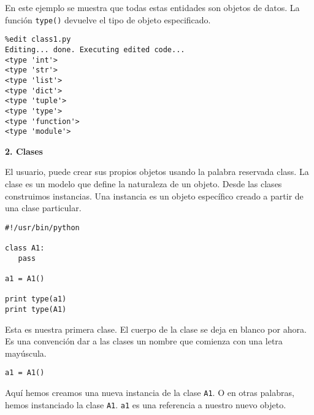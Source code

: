 \documentclass[twoside,10.5pt]{article}%
\begin{document}
\vspace{0.3cm}


En este ejemplo se muestra que todas estas entidades son objetos de datos. La funci\'on \texttt{type()} devuelve el tipo de objeto especificado.

\vspace{0.3cm}

\begin{verbatim}
%edit class1.py
Editing... done. Executing edited code...
<type 'int'>
<type 'str'>
<type 'list'>
<type 'dict'>
<type 'tuple'>
<type 'type'>
<type 'function'>
<type 'module'>
\end{verbatim}

\vspace{0.3cm}

\textbf{2. Clases}

El usuario, puede crear sus propios objetos usando la palabra reservada {\color{red} class}. La clase es un modelo que define la naturaleza  de un objeto. Desde las clases construimos {\color{red}instancias}. Una instancia es un objeto espec\'ifico creado a partir de una clase particular.

\vspace{0.3cm}

\begin{verbatim}
#!/usr/bin/python

class A1:
   pass

a1 = A1()

print type(a1)
print type(A1)
\end{verbatim}

\vspace{0.3cm}

Esta es nuestra primera clase. El cuerpo de la clase se deja en blanco por ahora. Es una convenci\'on  dar a las clases un nombre que comienza con una letra may\'uscula.

\vspace{0.3cm}

\begin{verbatim}
a1 = A1()
\end{verbatim}

\vspace{0.3cm}

Aqu\'i hemos creamos una nueva instancia de la  clase \texttt{A1}. O en otras palabras, hemos instanciado la clase \texttt{A1}. \texttt{a1} es una referencia a nuestro nuevo objeto.

\vspace{0.3cm}
\end{document}
